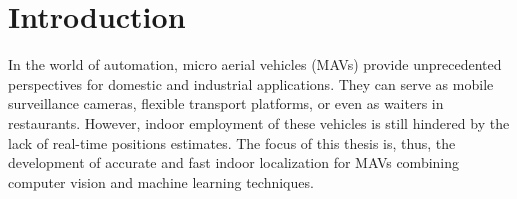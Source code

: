 \chapter{Introduction}
\label{chap:introduction}


In the world of automation, micro aerial vehicles (MAVs) provide unprecedented perspectives for domestic and industrial applications. They can serve as mobile surveillance cameras, flexible transport platforms, or even as waiters in restaurants. However, indoor employment of these vehicles
is still hindered by the lack of real-time positions estimates. The focus of this thesis is,
thus, the development of accurate and fast indoor localization for
MAVs combining computer vision and machine learning techniques.

